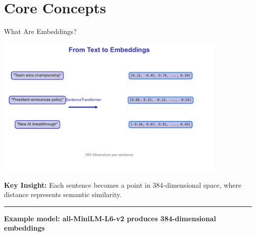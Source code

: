 \documentclass[8pt,aspectratio=169]{beamer}
\newcommand{\bottomnote}[1]{%
\vfill
\vspace{-2mm}
\textcolor{mllavender2}{\rule{\textwidth}{0.4pt}}
\vspace{1mm}
\footnotesize
\textbf{#1}
}
\begin{document}
\section{Core Concepts}

\begin{frame}[t]{What Are Embeddings?}

\vspace{0.3cm}

\begin{center}
\includegraphics[width=0.85\textwidth]{charts/embedding_concept.pdf}
\end{center}

\vspace{0.2cm}

\textbf{Key Insight:} Each sentence becomes a point in 384-dimensional space, where distance represents semantic similarity.

\bottomnote{Example model: all-MiniLM-L6-v2 produces 384-dimensional embeddings}
\end{frame}
\end{document}
